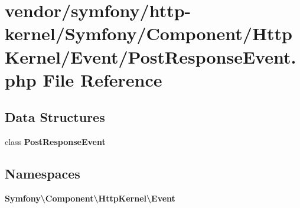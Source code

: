 \section{vendor/symfony/http-\/kernel/\+Symfony/\+Component/\+Http\+Kernel/\+Event/\+Post\+Response\+Event.php File Reference}
\label{_post_response_event_8php}
\subsection*{Data Structures}
\begin{DoxyCompactItemize}
\item 
class {\bf Post\+Response\+Event}
\end{DoxyCompactItemize}
\subsection*{Namespaces}
\begin{DoxyCompactItemize}
\item 
 {\bf Symfony\textbackslash{}\+Component\textbackslash{}\+Http\+Kernel\textbackslash{}\+Event}
\end{DoxyCompactItemize}
